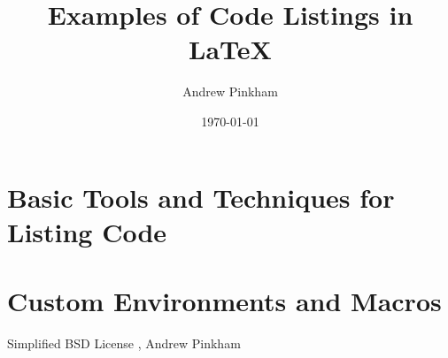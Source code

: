 


\title{Examples of Code Listings in \LaTeX{}}
\author{Andrew Pinkham} %
\date{\today}





\maketitle


\section[Basic Techniques]{Basic Tools and Techniques for Listing Code}




\section[Macros]{Custom Environments and Macros}


\begin{center}
Simplified BSD License , Andrew Pinkham
 \end{center}


